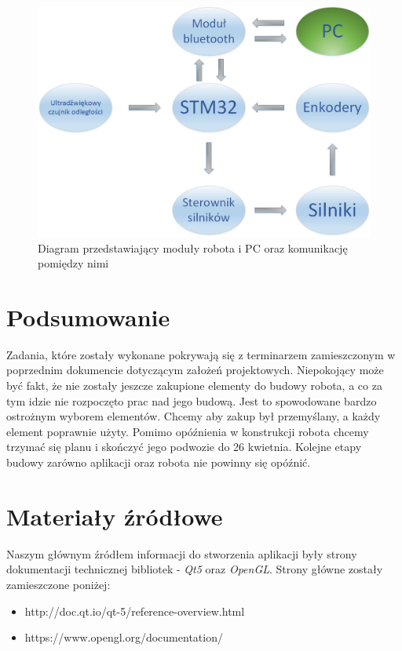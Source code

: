 \documentclass[a4paper]{article}
\begin{document}
\begin{figure}
\centering
\includegraphics[width=\linewidth]{diagram_komunikacji_modulow_img}
\caption{Diagram przedstawiający moduły robota i PC oraz komunikację pomiędzy nimi}
\label{moduly_robota_pc}
\end{figure}


\section{Podsumowanie}

Zadania, które zostały wykonane pokrywają się z terminarzem zamieszczonym w poprzednim dokumencie dotyczącym założeń projektowych. Niepokojący może być fakt, że nie zostały jeszcze zakupione elementy do budowy robota, a co za tym idzie nie rozpoczęto prac nad jego budową. Jest to spowodowane bardzo ostrożnym wyborem elementów. Chcemy aby zakup był przemyślany, a każdy element poprawnie użyty. Pomimo opóźnienia w konstrukcji robota chcemy trzymać się planu i skończyć jego podwozie do 26 kwietnia. Kolejne etapy budowy zarówno aplikacji oraz robota nie powinny się opóźnić.

\section{Materiały źródłowe}

Naszym głównym źródłem informacji do stworzenia aplikacji były strony dokumentacji technicznej bibliotek - \textit{Qt5} oraz \textit{OpenGL}. Strony główne zostały zamieszczone poniżej:

\begin{itemize}
\item http://doc.qt.io/qt-5/reference-overview.html
\item https://www.opengl.org/documentation/
\end{itemize}
\end{document}
